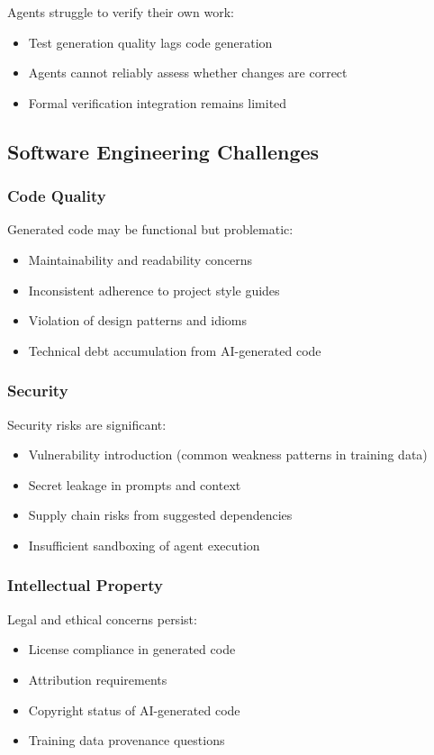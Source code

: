 Agents struggle to verify their own work:
\begin{itemize}
    \item Test generation quality lags code generation
    \item Agents cannot reliably assess whether changes are correct
    \item Formal verification integration remains limited
\end{itemize}

\subsection{Software Engineering Challenges}

\subsubsection{Code Quality}

Generated code may be functional but problematic:
\begin{itemize}
    \item Maintainability and readability concerns
    \item Inconsistent adherence to project style guides
    \item Violation of design patterns and idioms
    \item Technical debt accumulation from AI-generated code
\end{itemize}

\subsubsection{Security}

Security risks are significant:
\begin{itemize}
    \item Vulnerability introduction (common weakness patterns in training data)
    \item Secret leakage in prompts and context
    \item Supply chain risks from suggested dependencies
    \item Insufficient sandboxing of agent execution
\end{itemize}

\subsubsection{Intellectual Property}

Legal and ethical concerns persist:
\begin{itemize}
    \item License compliance in generated code
    \item Attribution requirements
    \item Copyright status of AI-generated code
    \item Training data provenance questions
\end{itemize}

